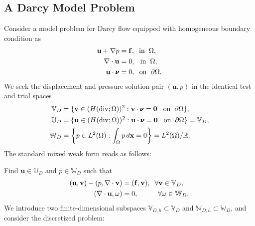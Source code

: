 \subsection{A Darcy Model Problem}
Consider a model problem for Darcy flow equipped with homogeneous boundary condition as
\begin{equation}
\begin{aligned}
\bold{u} + \nabla p & = \bold{f}, \hspace{0.2cm} \text{in} \hspace{0.2cm} \Omega,\\
\nabla \cdot \bold{u} & = 0, \hspace{0.25cm} \text{in} \hspace{0.2cm} \Omega, \\
		  \mathbf{u}\cdot\pmb{\nu} &= 0, \hspace{0.2cm} \text{on} \hspace{0.2cm} \partial \Omega.
\end{aligned}
\end{equation}
We seek the displacement and pressure solution pair $(\mathbf{u},p)$ in the 
identical test and trial spaces 
\begin{equation}\label{eq:HdivspaceVariation}
		  \begin{aligned}
					 \mathbb{V}_D &= \{\mathbf{v} \in (H(\text{div};\Omega))^2 : \mathbf{v}\cdot\pmb{\nu} = \mathbf{0} \hspace{0.3cm} \text{on} \hspace{0.2cm} \partial \Omega\}, \\
					 \mathbb{U}_D &= \{\mathbf{u} \in (H(\text{div};\Omega))^2 : \mathbf{u}\cdot\pmb{\nu} = \mathbf{0} 
					 \hspace{0.3cm} \text{on} \hspace{0.2cm} \partial \Omega\} = \mathbb{V}_D, \\
					 \mathbb{W}_D &= \bigg\{p \in L^2(\Omega) : \int_\Omega p\, d\mathbf{x} = 0\bigg\} = L^2(\Omega)/\mathbb{R}.
		  \end{aligned}
\end{equation}
The standard mixed weak form reads as follows: 

Find $\mathbf{u} \in \mathbb{U}_D$  
and $p \in \mathbb{W}_D$ such that
\begin{equation}\label{eq:hdivweakmodel}
		  \begin{aligned}
					 (\mathbf{u}, \mathbf{v}) - (p, \nabla \cdot \mathbf{v}) &= (\mathbf{f},\mathbf{v}), \hspace{0.2cm} \forall \mathbf{v} \in \mathbb{V}_D,\\
					 (\nabla \cdot \mathbf{u}, \omega) &= 0, \hspace{1cm} \forall \omega \in \mathbb{W}_D.
		  \end{aligned}
\end{equation}
We introduce two finite-dimensional subspaces $\mathbb{V}_{D,h} \subset \mathbb{V}_{D}$ and $\mathbb{W}_{D,h} \subset \mathbb{W}_{D}$, and consider
the discretized problem: 

